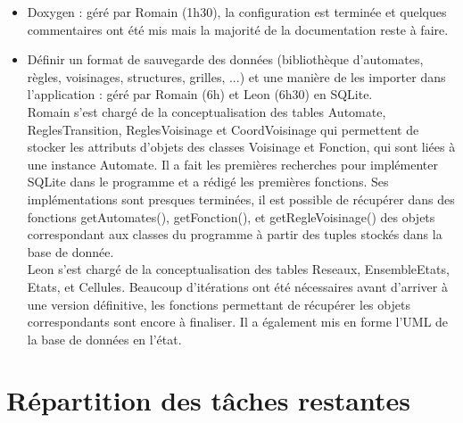 \documentclass[11pt]{article}
\begin{document}
\begin{itemize}
    \bigskip
    \item Doxygen : géré par Romain (1h30), la configuration est terminée et quelques commentaires ont été mis mais la majorité de la documentation reste à faire.
    \bigskip
    \item Définir un format de sauvegarde des données (bibliothèque d'automates, règles, voisinages, structures, grilles, ...) et une manière de les importer dans l'application : géré par Romain (6h) et Leon (6h30) en SQLite.\\
    Romain s'est chargé de la conceptualisation des tables Automate, ReglesTransition, ReglesVoisinage et CoordVoisinage qui permettent de stocker les attributs d'objets des classes Voisinage et Fonction, qui sont liées à une instance Automate. Il a fait les premières recherches pour implémenter SQLite dans le programme et a rédigé les premières fonctions. Ses implémentations sont presques terminées, il est possible de récupérer dans des fonctions getAutomates(), getFonction(), et getRegleVoisinage() des objets correspondant aux classes du programme à partir des tuples stockés dans la base de donnée.\\
    Leon s'est chargé de la conceptualisation des tables Reseaux, EnsembleEtats, Etats, et Cellules. Beaucoup d'itérations ont été nécessaires avant d'arriver à une version définitive, les fonctions permettant de récupérer les objets correspondants sont encore à finaliser. Il a également mis en forme l'UML de la base de données en l'état.
\end{itemize}

\section{Répartition des tâches restantes}
\end{document}
